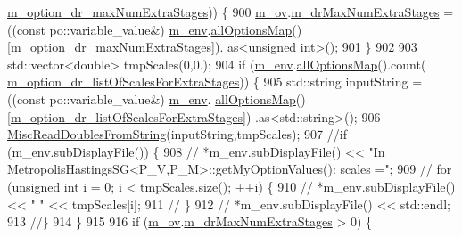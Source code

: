 \begin{DoxyCode}
      \hyperlink{class_q_u_e_s_o_1_1_metropolis_hastings_s_g_options_a8975cf2f3431edb501ccc94f0c65b2c3}{m\_option\_dr\_maxNumExtraStages})) \{
900     \hyperlink{class_q_u_e_s_o_1_1_metropolis_hastings_s_g_options_a9d4792d9fc2dc5439b8ab489b0c236eb}{m\_ov}.\hyperlink{class_q_u_e_s_o_1_1_mh_options_values_ab72acd4e4b80dd5c3a4b361466474f21}{m\_drMaxNumExtraStages} = ((\textcolor{keyword}{const} po::variable\_value&) 
      \hyperlink{class_q_u_e_s_o_1_1_metropolis_hastings_s_g_options_a328a978b771885e14d536272ff4aa9ef}{m\_env}.\hyperlink{class_q_u_e_s_o_1_1_base_environment_ae7cee155956e0e70112f45e2ad1f02c8}{allOptionsMap}()[\hyperlink{class_q_u_e_s_o_1_1_metropolis_hastings_s_g_options_a8975cf2f3431edb501ccc94f0c65b2c3}{m\_option\_dr\_maxNumExtraStages}]).
      as<unsigned int>();
901   \}
902 
903   std::vector<double> tmpScales(0,0.);
904   \textcolor{keywordflow}{if} (\hyperlink{class_q_u_e_s_o_1_1_metropolis_hastings_s_g_options_a328a978b771885e14d536272ff4aa9ef}{m\_env}.\hyperlink{class_q_u_e_s_o_1_1_base_environment_ae7cee155956e0e70112f45e2ad1f02c8}{allOptionsMap}().count(
      \hyperlink{class_q_u_e_s_o_1_1_metropolis_hastings_s_g_options_a23025b02dde1763feed23f53a6549ac0}{m\_option\_dr\_listOfScalesForExtraStages})) \{
905     std::string inputString = ((\textcolor{keyword}{const} po::variable\_value&) \hyperlink{class_q_u_e_s_o_1_1_metropolis_hastings_s_g_options_a328a978b771885e14d536272ff4aa9ef}{m\_env}.
      \hyperlink{class_q_u_e_s_o_1_1_base_environment_ae7cee155956e0e70112f45e2ad1f02c8}{allOptionsMap}()[\hyperlink{class_q_u_e_s_o_1_1_metropolis_hastings_s_g_options_a23025b02dde1763feed23f53a6549ac0}{m\_option\_dr\_listOfScalesForExtraStages}])
      .as<std::string>();
906     \hyperlink{namespace_q_u_e_s_o_ac3fab438679d1dc864f8d629881dad2e}{MiscReadDoublesFromString}(inputString,tmpScales);
907     \textcolor{comment}{//if (m\_env.subDisplayFile()) \{}
908     \textcolor{comment}{//  *m\_env.subDisplayFile() << "In MetropolisHastingsSG<P\_V,P\_M>::getMyOptionValues(): scales =";}
909     \textcolor{comment}{//  for (unsigned int i = 0; i < tmpScales.size(); ++i) \{}
910     \textcolor{comment}{//    *m\_env.subDisplayFile() << " " << tmpScales[i];}
911     \textcolor{comment}{//  \}}
912     \textcolor{comment}{//  *m\_env.subDisplayFile() << std::endl;}
913     \textcolor{comment}{//\}}
914   \}
915 
916   \textcolor{keywordflow}{if} (\hyperlink{class_q_u_e_s_o_1_1_metropolis_hastings_s_g_options_a9d4792d9fc2dc5439b8ab489b0c236eb}{m\_ov}.\hyperlink{class_q_u_e_s_o_1_1_mh_options_values_ab72acd4e4b80dd5c3a4b361466474f21}{m\_drMaxNumExtraStages} > 0) \{

\end{DoxyCode}
